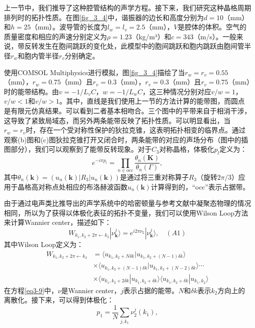 上一节中，我们推导了这种腔管结构的声学方程。接下来，我们研究这种晶格周期排列时的拓扑性质。在图\ref{fig_3_4}中，谐振器的边长和高度分别为$d = 10$（mm）和$h = 25$（mm）。波导管的长度为$l_w = l_v = 2.5$（mm），$V$是腔体的体积。空气的质量密度和相应的声速分别定义为$\rho = 1.23$（kg/m³）和$c = 343$（m/s）。一般来说，带反转发生在胞间跳跃的变化处，此模型中的胞间跳跃和胞内跳跃由胞间管半径$r_w$和胞内管半径$r_v$分别确定。

使用COMSOL Multiphysics进行模拟，图\ref{fig_3_4}描绘了当$r_w = r_v = 0.55$（mm），$r_w = 0.75$（mm）且$r_v = 0.3$（mm），$r_v = 0.3$（mm）且$r_v = 0.75$（mm）时的能带结构。由$v = -1/L_vC$，$w = -1/L_wC$，这三种情况分别对应$v/w=1$，$v/w<1$和$v/w>1$。其中，直线是我们使用上一节的方法计算的能带图，而圆点是有限元仿真结果。可以看到二者基本相吻合。三个图中的平带来自于相消干涉，这导致了紧致局域态，而另外两条能带反映了拓扑性质\cite{C3-1,C3-2}。可以明显看出，当$r_w = r_v$时，存在一个受对称性保护的狄拉克锥，这表明拓扑相变的临界点。通过观察(b)图和(c)图狄拉克锥打开又闭合时，两条能带的对应的声场分布（图中的插图部分），我们可以观察到了能带反转现象。对于$C_3$对称晶格，体极化$p_l$定义为：
\begin{equation} \label{eq3-8}
  e^{-i\pi p_l} = \prod_{n \in \text{occ}} \frac{\theta_n(\mathbf{K})}{\theta_n(\Gamma)},
\end{equation}
其中$\theta_n(\mathbf{k}) = (u_n(\mathbf{k})|R_{3}|u_n(\mathbf{k}))$是通过将三重对称算子$R_3$（旋转$2\pi/3$）应用于晶格高对称点处相应的布洛赫波函数$u_n(\mathbf{k})$计算得到的，“occ”表示占据带。

由于通过电声类比推导出的声学系统中的哈密顿量与参考文献\cite{f6}中凝聚态物理的情况相同，所以为了获得以体极化表征的拓扑不变量，我们可以使用Wilson Loop方法来计算Wannier center，描述如下\cite{i5}：
\[W_{k_1,k_2 + 2\pi \leftarrow k_2}|\nu_{\mathbf{k}}^j\rangle = e^{i2\pi \nu_2}|\nu_{\mathbf{k}}^j\rangle,\quad (A1)\]
其中Wilson Loop定义为：
\begin{equation}\label{eq3-9}
  \begin{aligned}
  W_{k_1,k_2 + 2\pi \leftarrow k_2} &= \langle u_{k_1,k_2 + N\delta k}|u_{k_1,k_2 + (N - 1)\delta k}\rangle\\
  &\times \langle u_{k_1,k_2 + (N - 1)\delta k}|u_{k_1,k_2 + (N - 2)\delta k}\rangle \cdots\\
  &\times \langle u_{k_1,k_2 + 2\delta k}|u_{k_1,k_2 + \delta k}\rangle\langle u_{k_1,k_2 + \delta k}|u_{k_1,k_2}\rangle
  \end{aligned}
\end{equation}
在方程\ref{eq3-9}中，\(\nu\)是Wannier center，\(j\)表示占据的能带。\(N\)和\(\delta k\)表示\(k_2\)方向上的离散化。接下来，可以得到体极化：
\begin{equation} \label{eq3-10}
  p_1 = \frac{1}{N} \sum_{j,k_1} \nu_2^j(k_1),
\end{equation}

